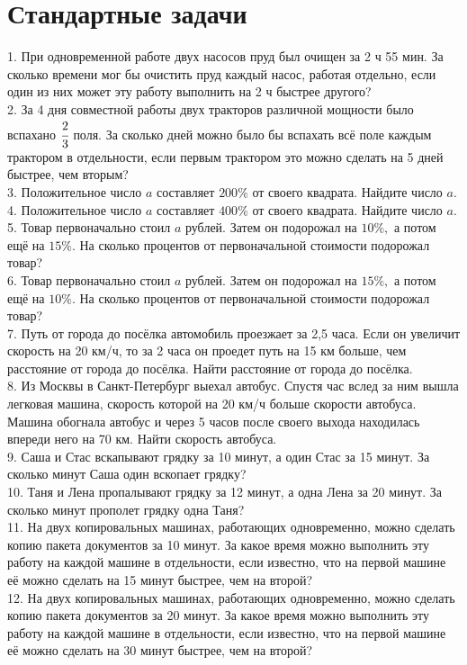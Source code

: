 \section{Стандартные задачи}
1. При одновременной работе двух насосов пруд был очищен за 2 ч 55 мин. За сколько времени мог бы очистить пруд каждый насос, работая отдельно, если один из них может эту работу выполнить на 2 ч быстрее другого?\\
2. За 4 дня совместной работы двух тракторов различной мощности было вспахано $\cfrac{2}{3}$ поля. За сколько дней можно было бы вспахать всё поле каждым трактором в отдельности, если первым трактором это можно сделать на 5 дней быстрее, чем вторым?\\
3. Положительное число $a$ составляет $200\%$ от своего квадрата. Найдите число $a.$\\
4. Положительное число $a$ составляет $400\%$ от своего квадрата. Найдите число $a.$\\
5. Товар первоначально стоил $a$ рублей. Затем он подорожал на $10\%,$ а потом ещё на $15\%.$ На сколько процентов от первоначальной стоимости подорожал товар?\\
6. Товар первоначально стоил $a$ рублей. Затем он подорожал на $15\%,$ а потом ещё на $10\%.$ На сколько процентов от первоначальной стоимости подорожал товар?\\
7. Путь от города до посёлка автомобиль проезжает за 2,5 часа. Если он увеличит скорость на 20 км/ч, то за 2 часа он проедет путь на 15 км больше, чем расстояние от города до посёлка. Найти расстояние от города до посёлка.\\
8. Из Москвы в Санкт-Петербург выехал автобус. Спустя час вслед за ним вышла
легковая машина, скорость которой на 20 км/ч больше скорости автобуса. Машина обогнала автобус и через 5 часов после своего выхода находилась впереди него на 70 км. Найти скорость автобуса.\\
9. Саша и Стас вскапывают грядку за 10 минут, а один Стас за 15 минут. За сколько минут Саша один вскопает грядку?\\
10. Таня и Лена пропалывают грядку за 12 минут, а одна Лена за 20 минут. За сколько минут прополет грядку одна Таня?\\
11. На двух копировальных машинах, работающих одновременно, можно сделать копию пакета документов за 10 минут. За какое время можно выполнить эту работу на каждой машине в отдельности, если известно, что на первой машине её можно сделать на 15 минут быстрее, чем на второй?\\
12. На двух копировальных машинах, работающих одновременно, можно сделать копию пакета документов за 20 минут. За какое время можно выполнить эту работу на каждой машине в отдельности, если известно, что на первой машине её можно сделать на 30 минут быстрее, чем на второй?\\
